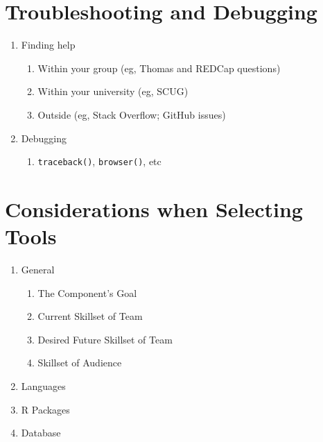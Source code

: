\documentclass[]{book}
\providecommand{\tightlist}{%
  \setlength{\itemsep}{0pt}\setlength{\parskip}{0pt}}
\theoremstyle{definition}
\theoremstyle{definition}
\theoremstyle{definition}
\theoremstyle{remark}
\begin{document}
\hypertarget{troubleshooting-and-debugging}{%
\chapter{Troubleshooting and
Debugging}\label{troubleshooting-and-debugging}}

\begin{enumerate}
\def\labelenumi{\arabic{enumi}.}
\tightlist
\item
  Finding help

  \begin{enumerate}
  \def\labelenumii{\arabic{enumii}.}
  \tightlist
  \item
    Within your group (eg, Thomas and REDCap questions)
  \item
    Within your university (eg, SCUG)
  \item
    Outside (eg, Stack Overflow; GitHub issues)
  \end{enumerate}
\item
  Debugging

  \begin{enumerate}
  \def\labelenumii{\arabic{enumii}.}
  \tightlist
  \item
    \texttt{traceback()}, \texttt{browser()}, etc
  \end{enumerate}
\end{enumerate}

\hypertarget{considerations-when-selecting-tools}{%
\chapter{Considerations when Selecting
Tools}\label{considerations-when-selecting-tools}}

\begin{enumerate}
\def\labelenumi{\arabic{enumi}.}
\tightlist
\item
  General

  \begin{enumerate}
  \def\labelenumii{\arabic{enumii}.}
  \tightlist
  \item
    The Component's Goal
  \item
    Current Skillset of Team
  \item
    Desired Future Skillset of Team
  \item
    Skillset of Audience
  \end{enumerate}
\item
  Languages
\item
  R Packages
\item
  Database
\end{enumerate}
\end{document}
